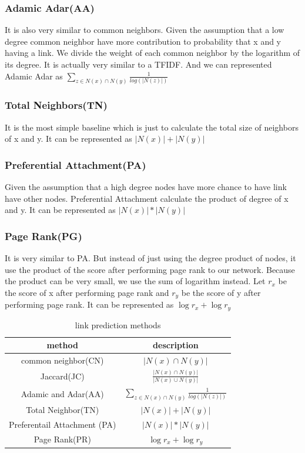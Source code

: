 \documentclass[12pt]{article}
\begin{document}
\subsubsection{Adamic Adar(AA)}
It is also very similar to common neighbors. Given the assumption that a low degree common neighbor have more contribution to probability that x and y having a link. We divide the weight of each common neighbor by the logarithm of its degree. It is actually very similar to a TFIDF. And we can represented Adamic Adar as $\sum_{z \in N(x) \cap N(y)}{\frac{1}{log(|N(z)|)}}$
\subsubsection{Total Neighbors(TN)}
It is the most simple baseline which is just to calculate the total size of neighbors of x and y. It can be represented as $|N(x)| + |N(y)|$
\subsubsection{Preferential Attachment(PA)}
Given the assumption that a high degree nodes have more chance to have link have other nodes. Preferential Attachment calculate the product of degree of x and y. It can be represented as $|N(x)| * |N(y)|$
\subsubsection{Page Rank(PG)}
It is very similar to PA. But instead of just using the degree product of nodes, it use the product of the score after performing page rank to our network. Because the product can be very small, we use the sum of logarithm instead. Let $r_x$ be the score of x after performing page rank and $r_y$ be the score of y after performing page rank. It can be represented as $\log{r_x} + \log{r_y}$
\begin{table}
	\begin{center}
		\begin{tabular}{|c|c|}
			\hline
			method & description \\
			\hline
			common neighbor(CN) & $|N(x) \cap N(y)|$ \\
			Jaccard(JC) & $\frac{|N(x) \cap N(y)|}{|N(x) \cup N(y)|}$ \\
			Adamic and Adar(AA) & $\sum_{z \in N(x) \cap N(y)}{\frac{1}{log(|N(z)|)}}$ \\
			Total Neighbor(TN) & $|N(x)| + |N(y)|$ \\
			Preferentail Attachment (PA) & $|N(x)| * |N(y)|$ \\
			Page Rank(PR)  & $\log{r_x} + \log{r_y}$ \\	
			\hline
		\end{tabular}
	\end{center}
\caption{link prediction methods}
\label{tab:method}
\end{table}
\end{document}
